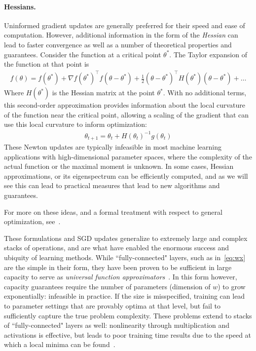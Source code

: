 \paragraph{Hessians.}
Uninformed gradient updates
are generally preferred
for their speed and ease of computation.
However, additional information in the form of the \textit{Hessian}
can lead to faster convergence
as well as a number of theoretical properties and guarantees.
Consider the function at a critical point $\theta^*$.
The Taylor expansion of the function at that point is
\begin{align}
f(\theta) = f(\theta^*) + \nabla f(\theta^*)^\top f(\theta - \theta^*) + \frac{1}{2}(\theta - \theta^*)^\top H(\theta^*)(\theta - \theta^*) + \ldots
\end{align}
Where $H(\theta^*)$ is the Hessian matrix at the point $\theta^*$. 
With no additional terms, this second-order approximation provides information
about the local curvature of the function near the critical point,
allowing a scaling of the gradient that can use this local 
curvature to inform optimization:
\begin{align}\label{eq:newtonstep}
	\theta_{t+1} = \theta_t + H(\theta_t)^{-1} g(\theta_t)
\end{align}
These Newton updates are typically infeasible in most
machine learning applications with high-dimensional
parameter spaces, where the complexity of
the actual function or the maximal moment is unknown.
In some cases, Hessian approximations,
or its eigenspectrum can be efficiently computed,
and as we will see this can lead to 
practical measures that lead to new
algorithms and guarantees.

For more on these ideas, 
and a formal treatment with respect to 
general optimization, see~\cite{wright1999numerical}.

These formulations and SGD updates generalize
to extremely large and complex stacks
of operations, and are what have enabled
the enormous success and ubiquity of learning
methods.
While ``fully-connected" layers, such as
in~\eqref{eq:wx} are the simple in their form,
they have been proven to be sufficient
in large capacity to serve as
\textit{universal function approximators}~\citep{abc}.
In this form however, capacity guarantees
require the number of parameters (dimension of $w$)
to grow exponentially: infeasible in practice.
If the size is misspecified, training
can lead to parameter settings that are provably
optima at that level, but fail to sufficiently
capture the true problem complexity.
These problems extend to stacks of ``fully-connected"
layers as well: nonlinearity through multiplication
and activations is effective, but leads
to poor training time results due to 
the speed at which a local minima can be found~\citep{abc}.

